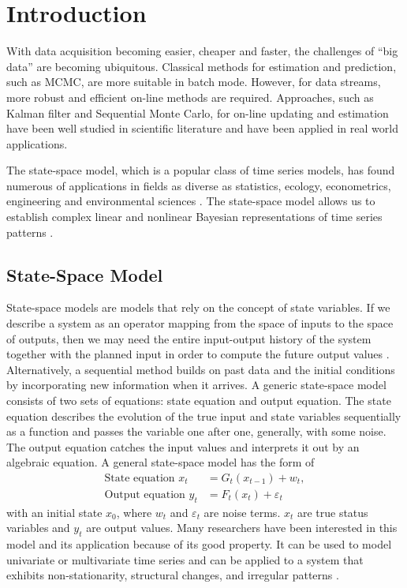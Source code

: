 
\section{Introduction}

With data acquisition becoming easier, cheaper and faster, the challenges of ``big data'' are becoming ubiquitous. Classical methods for estimation and prediction, such as MCMC, are more suitable in batch mode. However, for data streams, more robust and efficient on-line methods are required. Approaches, such as Kalman filter and Sequential Monte Carlo, for on-line updating and estimation have been well studied in scientific literature and have been applied in real world applications.

The state-space model, which is a popular class of time series models, has found numerous of applications in fields as diverse as statistics, ecology, econometrics, engineering and environmental sciences \citep{cappe2009inference, smcmip2011, elliott1995estimation, cargnoni1997bayesian}. The state-space model allows us to establish complex linear and nonlinear Bayesian representations of time series patterns \citep{vieira2016online}. 


\subsection*{State-Space Model}

State-space models are models that rely on the concept of state variables. If we describe a system as an operator mapping from the space of inputs to the space of outputs, then we may need the entire input-output history of the system together with the planned input in order to compute the future output values \citep{hangos2006analysis}. Alternatively, a sequential method builds on past data and the initial conditions by incorporating new information when it arrives. A generic state-space model consists of two sets of equations: state equation and output equation. The state equation describes the evolution of the true input and state variables sequentially as a function and passes the variable one after one, generally, with some noise. The output equation catches the input values and interprets it out by an algebraic equation. A general state-space model has the form of 
\begin{align}\label{statemodel1}
\mbox{State equation } x_t &= G_t(x_{t-1})+w_t,\\
\label{statemodel2}
\mbox{Output equation } y_t &=F_t(x_t)+\varepsilon_t
\end{align}
with an initial state $x_0$, where $w_t$ and $\varepsilon_t$ are noise terms. $x_t$ are true status variables and $y_t$ are output values. Many researchers have been interested in this model and its application because of its good property. It can be used to model univariate or multivariate time series and can be applied to a system that exhibits non-stationarity, structural changes, and irregular patterns \citep{petris2009dynamic}.

